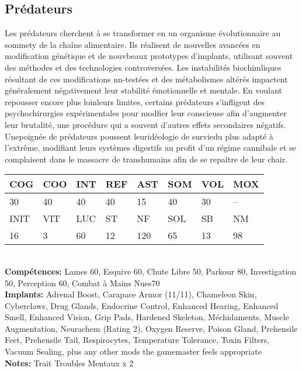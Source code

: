 \subsection{Prédateurs} 

Les prédateurs cherchent à se transformer en un organisme évolutionnaire au sommety de la chaîne alimentaire. Ils réalisent de nouvelles avancées en modification génétique et de nouvbeaux prototypes d'implants, utilisant souvent des méthodes et des technologies controversées. Les instabilités biochimliques résultant de ces modifications nn-testées et des métabolismes altérés impactent généralement négativement leur stabilité émotionnelle et mentale. En voulant repousser encore plus loinleurs limites, certains prédateurs s'infligent des psychochirurgies expérimentales pour modfier leur conscieuse afin d'augmenter leur brutalité, une procédure qui a souvent d'autres effets secondaires négatifs. Unepoignée de prédateurs poussent leuridéologie de surviedu plus adapté à l'extrême, modifiant leurs systèmes digestifs au profit d'un régime cannibale et se complaisent dans le massacre de transhumains afin de se repaître de leur chair. 

\begin{tabular}{|l|l|l|l|l|l|l|l|} \hline

COG &COO &INT &REF &AST &SOM &VOL &MOX \\ \hline

30 &40 &40 &40 &15 &40 &30 &-- \\ \hline

INIT &VIT &LUC &ST &NF &SOL &SB &NM \\ \hline

16 &3 &60 &12 &120 &65 &13 &98 \\ \hline

\end{tabular} \\ \textbf{Compétences:} Lames 60, Esquive 60, Chute Libre 50, Parkour 80, Investigation 50, Perception 60, Combat à Mains Nues70 \\ \textbf{Implants:} Adrenal Boost, Carapace Armor (11/11), Chameleon Skin, Cyberclaws, Drug Glands, Endocrine Control, Enhanced Hearing, Enhanced Smell, Enhanced Vision, Grip Pads, Hardened Skeleton, Méchidaments, Muscle Augmentation, Neurachem (Rating 2), Oxygen Reserve, Poison Gland, Prehensile Feet, Prehensile Tail, Respirocytes, Temperature Tolerance, Toxin Filters, Vacuum Sealing, plus any other mods the gamemaster feels appropriate \\ \textbf{Notes:} Trait Troubles Mentaux x 2 \\ 

